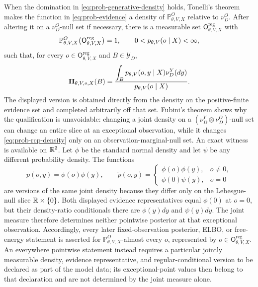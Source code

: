 When the domination in \eqref{eq:prob-generative-density} holds, Tonelli's theorem makes the function in \eqref{eq:prob-evidence} a density of $\mathbb P_{\theta,V,X}^{O}$ relative to $\nu_D^O$. After altering it on a $\nu_D^O$-null set if necessary, there is a measurable set $\mathsf O_{\theta,V,X}^{\mathrm{reg}}$ with
\begin{equation}
\mathbb P_{\theta,V,X}^{O}\bigl(\mathsf O_{\theta,V,X}^{\mathrm{reg}}\bigr)=1,
\qquad
0<p_{\theta,V}(o\mid X)<\infty,
\label{eq:prob-regular-observations}
\end{equation}
such that, for every $o\in\mathsf O_{\theta,V,X}^{\mathrm{reg}}$ and $B\in\mathscr Y_D$,
\begin{equation}
\boldsymbol\Pi_{\theta,V,o,X}(B)
=\frac{\displaystyle\int_B p_{\theta,V}(o,y\mid X)\nu_D^Y(dy)}
{\displaystyle p_{\theta,V}(o\mid X)}.
\label{eq:prob-rcp-density}
\end{equation}
The displayed version is obtained directly from the density on the positive-finite evidence set and completed arbitrarily off that set. Fubini's theorem shows why the qualification is unavoidable: changing a joint density on a $(\nu_D^Y\otimes\nu_D^O)$-null set can change an entire slice at an exceptional observation, while it changes \eqref{eq:prob-rcp-density} only on an observation-marginal-null set. An exact witness is available on $\mathbb R^2$. Let $\phi$ be the standard normal density and let $\psi$ be any different probability density. The functions
\[
p(o,y)=\phi(o)\phi(y),
\qquad
\widetilde p(o,y)=
\begin{cases}
\phi(o)\phi(y),&o\neq0,\\
\phi(0)\psi(y),&o=0
\end{cases}
\]
are versions of the same joint density because they differ only on the Lebesgue-null slice $\mathbb R\times\{0\}$. Both displayed evidence representatives equal $\phi(0)$ at $o=0$, but their density-ratio conditionals there are $\phi(y)dy$ and $\psi(y)dy$. The joint measure therefore determines neither pointwise posterior at that exceptional observation. Accordingly, every later fixed-observation posterior, ELBO, or free-energy statement is asserted for $\mathbb P_{\theta,V,X}^{O}$-almost every $o$, represented by $o\in\mathsf O_{\theta,V,X}^{\mathrm{reg}}$. An everywhere pointwise statement instead requires a particular jointly measurable density, evidence representative, and regular-conditional version to be declared as part of the model data; its exceptional-point values then belong to that declaration and are not determined by the joint measure alone. 

